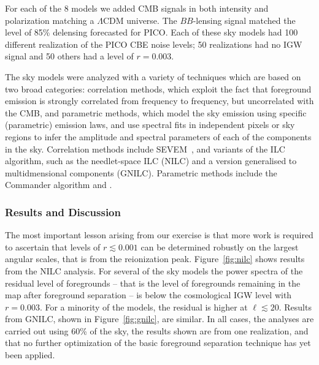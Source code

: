 \documentclass[PICOReport.tex]{subfiles}
\begin{document}
For each of the 8 models we added CMB signals in both intensity and polarization matching a $\Lambda$CDM universe. The $BB$-lensing signal matched the level of 85\% delensing forecasted for PICO. Each of these sky models had 100 different realization of the PICO CBE noise levels; 50 realizations had no \ac{IGW} signal and 50 others had a level of $r=0.003$. 

\vspace{0.1in}
 \hspace{0.1in} The sky models were analyzed with a variety of techniques which are based on two broad categories: correlation methods, which exploit the fact that foreground emission is strongly correlated from frequency to frequency, but uncorrelated with the CMB, and parametric methods, which model the sky emission using specific (parametric) emission laws, and use spectral fits in independent pixels or sky regions to infer the amplitude and spectral parameters of each of the components in the sky. Correlation methods include SEVEM~\citep{sevem}, and variants of the \ac{ILC} algorithm, such as the needlet-space \ac{ILC} (NILC) and a version generalised to multidmensional components (GNILC). Parametric methods include the Commander algorithm and .


\subsubsection{Results and Discussion}

The most important lesson arising from our exercise is that more work is required to ascertain that levels of $r \lesssim 0.001$ can be determined robustly on the largest angular scales, that is from the reionization peak.  Figure~\ref{fig:nilc} shows results from the NILC analysis. For several of the sky models the power spectra of the residual level of foregrounds -- that is the level of foregrounds remaining in the map after foreground separation -- is below the cosmological \ac{IGW} level with $r =0.003$. For a minority of the models, the residual is higher at $\ell \lesssim 20$. Results from GNILC, shown in Figure~\ref{fig:gnilc}, are similar. In all cases, the analyses are carried out using 60\% of the sky, the results shown are from one realization, and that no further optimization of the basic foreground separation technique has yet been applied. 
\end{document}
